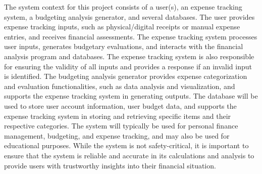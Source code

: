 \documentclass[12pt]{article}
\begin{document}
The system context for this project consists of a user(s), an expense tracking system, 
a budgeting analysis generator, and several databases. The user provides expense 
tracking inputs, such as physical/digital receipts or manual expense entries, and 
receives financial assessments. The expense tracking system processes user inputs, 
generates budgetary evaluations, and interacts with the financial analysis program 
and databases. The expense tracking system is also responsible for ensuring the 
validity of all inputs and provides a response if an invalid input is identified. 
The budgeting analysis generator provides expense categorization and evaluation 
functionalities, such as data analysis and visualization, and supports the expense 
tracking system in generating outputs. The database will be used to store user 
account information, user budget data, and supports the expense tracking system 
in storing and retrieving specific items and their respective categories. 
The system will typically be used for personal finance management, budgeting, 
and expense tracking, and may also be used for educational purposes. While 
the system is not safety-critical, it is important to ensure that the system is 
reliable and accurate in its calculations and analysis to provide users with 
trustworthy insights into their financial situation.



\end{document}
